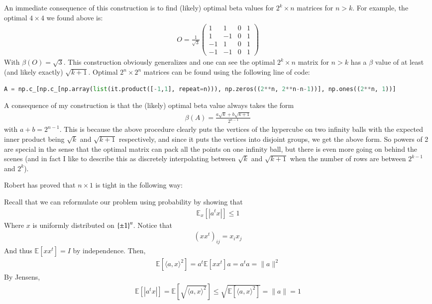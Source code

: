 \documentclass[12pt]{article}
\theoremstyle{definitionstyle}
\newcommand{\mg}[1]{\| #1 \|}
\renewcommand{\ip}[1]{\langle#1\rangle}
\newcommand{\SET}[1]{\Set{\mskip-\medmuskip #1 \mskip-\medmuskip}}
\newcommand{\E}{\mathbb E}
\begin{document}
    An immediate consequence of this construction is to find (likely) optimal beta values for $2^k \times n$ matrices for $n > k$. For example, the optimal $4 \times 4$ we found above is:
    \begin{align*}
        O = \frac{1}{\sqrt{3}}\begin{pmatrix}
            1 & 1 & 0 & 1 \\
            1 & -1 & 0 & 1 \\
            -1 & 1 & 0 & 1 \\
            -1 & -1 & 0 & 1
        \end{pmatrix}
    \end{align*}
    With $\beta(O) = \sqrt{3}$. This construction obviously generalizes and one can see the optimal $2^k \times n$ matrix for $n > k$ has a $\beta$ value of at least (and likely exactly) $\sqrt{k+1}$. Optimal $2^n \times 2^n$ matrices can be found using the following line of code:
    \begin{lstlisting}[language=Python]
        A = np.c_[np.c_[np.array(list(it.product([-1,1], repeat=n))), np.zeros((2**n, 2**n-n-1))], np.ones((2**n, 1))]
    \end{lstlisting}
    

    A consequence of my construction is that the (likely) optimal beta value always takes the form
    \begin{align*}
        \beta(A) = \frac{a\sqrt{k} + b\sqrt{k+1}}{2^{n-1}}
    \end{align*}
    with $a+b=2^{n-1}$. This is because the above procedure clearly puts the vertices of the hypercube on two infinity balls with the expected inner product being $\sqrt{k}$ and $\sqrt{k+1}$ respectively, and since it puts the vertices into disjoint groups, we get the above form. So powers of 2 are special in the sense that the optimal matrix can pack all the points on one infinity ball, but there is even more going on behind the scenes (and in fact I like to describe this as discretely interpolating between $\sqrt{k}$ and $\sqrt{k+1}$ when the number of rows are between $2^{k-1}$ and $2^k$).

    Robert has proved that $n \times 1$ is tight in the following way:

    Recall that we can reformulate our problem using probability by showing that 
    \begin{align*}
        \E_x[|a^t x|] \leq 1
    \end{align*}
    Where $x$ is uniformly distributed on $\SET{\pm 1}^n$. Notice that 
    \begin{align*}
        (xx^t)_{ij} = x_i x_j
    \end{align*}
    And thus $\E[xx^t] = I$ by independence. Then,
    \begin{align*}
        \E[\ip{a,x}^2] = a^t \E[xx^t] a = a^t a = \mg{a}^2
    \end{align*}
    By Jensens,
    \begin{align*}
        \E[|a^t x|] = \E[\sqrt{\ip{a,x}^2}] \leq \sqrt{\E[\ip{a,x}^2]} = \mg{a} = 1
    \end{align*}
\end{document}
